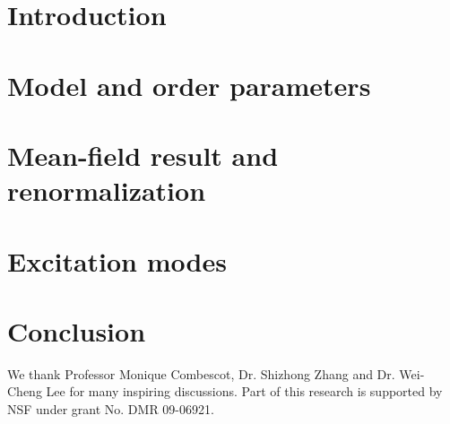 \documentclass[reprint,pra]{revtex4-1}
\begin{document}
\section{Introduction}

\section{Model and order parameters}
\section{Mean-field result and renormalization}
\section{Excitation modes}
\section{Conclusion}

\begin{acknowledgements}
We thank  Professor Monique Combescot, Dr. Shizhong Zhang and  Dr. Wei-Cheng Lee for many inspiring discussions. Part of this research  is supported  by NSF under grant No. DMR 09-06921. 
\end{acknowledgements}

\end{document}

